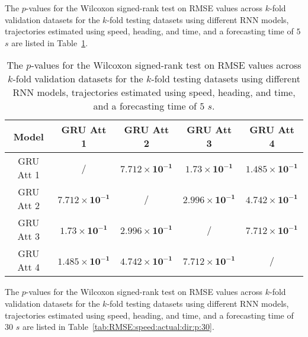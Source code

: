 The $p$-values for the Wilcoxon signed-rank test on RMSE values across $k$-fold validation datasets for the $k$-fold testing datasets using different RNN models, trajectories estimated using speed, heading, and time, and a forecasting time of $5$ $s$ are listed in Table~\ref{tab:RMSE:speed:actual:dir:p:5}.

\begin{table}[!ht]
	\centering
	\begin{tabular}{|c|c|c|c|c|}
		\hline
		Model & GRU Att 1 & GRU Att 2 & GRU Att 3 & GRU Att 4 \\ \hline
		GRU Att 1 & / & $\mathbf{7.712 \times 10^{-1}}$ & $\mathbf{1.73 \times 10^{-1}}$ & $\mathbf{1.485 \times 10^{-1}}$ \\ \hline
		GRU Att 2 & $\mathbf{7.712 \times 10^{-1}}$ & / & $\mathbf{2.996 \times 10^{-1}}$ & $\mathbf{4.742 \times 10^{-1}}$ \\ \hline
		GRU Att 3 & $\mathbf{1.73 \times 10^{-1}}$ & $\mathbf{2.996 \times 10^{-1}}$ & / & $\mathbf{7.712 \times 10^{-1}}$ \\ \hline
		GRU Att 4 & $\mathbf{1.485 \times 10^{-1}}$ & $\mathbf{4.742 \times 10^{-1}}$ & $\mathbf{7.712 \times 10^{-1}}$ & / \\ \hline
	\end{tabular}
	\caption{The $p$-values for the Wilcoxon signed-rank test on RMSE values across $k$-fold validation datasets for the $k$-fold testing datasets using different RNN models, trajectories estimated using speed, heading, and time, and a forecasting time of $5$ $s$.}
	\label{tab:RMSE:speed:actual:dir:p:5}
\end{table}

The $p$-values for the Wilcoxon signed-rank test on RMSE values across $k$-fold validation datasets for the $k$-fold testing datasets using different RNN models, trajectories estimated using speed, heading, and time, and a forecasting time of $30$ $s$ are listed in Table~\ref{tab:RMSE:speed:actual:dir:p:30}.

